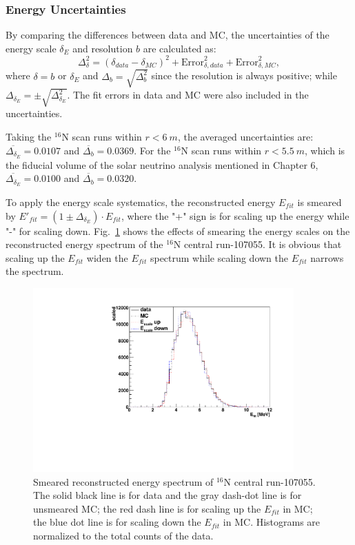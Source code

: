 \subsubsection{Energy Uncertainties}\label{sect:eneryUncertianties}
By comparing the differences between data and MC, the uncertainties of the energy scale $\delta_E$ and resolution $b$ are calculated as:
\begin{equation}
\Delta^2_{\delta}= (\delta_{data}-\delta_{MC})^2+\mathrm{Error}^2_{\delta,data}+\mathrm{Error}^2_{\delta,MC},
\end{equation}
where $\delta=b$ or $\delta_E$ and $\Delta_b=\sqrt{\Delta^2_{b}}$ since the resolution is always positive; while $\Delta_{\delta_E}=\pm\sqrt{\Delta^2_{\delta_E}}$. The fit errors in data and MC were also included in the uncertainties.

Taking the $^{16}$N scan runs within $r<6~m$, the averaged uncertainties are: $\overline{\Delta_{\delta_E}}=0.0107$ and $\overline{\Delta_{b}}=0.0369$. For the $^{16}$N scan runs within $r<5.5~m$, which is the fiducial volume of the solar neutrino analysis mentioned in Chapter 6, $\overline{\Delta_{\delta_E}}=0.0100$ and $\overline{\Delta_{b}}=0.0320$.

To apply the energy scale systematics, the reconstructed energy $E_{fit}$ is smeared by $E'_{fit}=(1\pm\Delta_{\delta_E})\cdot E_{fit}$, where the "+" sign is for scaling up the energy while "-" for scaling down. Fig.~\ref{fig:EscaleSmear} shows the effects of smearing the energy scales on the reconstructed energy spectrum of the $^{16}$N central run-107055. It is obvious that scaling up the $E_{fit}$ widen the $E_{fit}$ spectrum while scaling down the $E_{fit}$ narrows the spectrum. 
\begin{figure}
	\centering
	\includegraphics[width=10cm]{SmearedEscale_N16.pdf}
	\caption[Smeared reconstructed energy spectrum of $^{16}$N central run-107055.]{Smeared reconstructed energy spectrum of $^{16}$N central run-107055. The solid black line is for data and the gray dash-dot line is for unsmeared MC; the red dash line is for scaling up the $E_{fit}$ in MC; the blue dot line is for scaling down the $E_{fit}$ in MC. Histograms are normalized to the total counts of the data.}
	\label{fig:EscaleSmear}
\end{figure}

